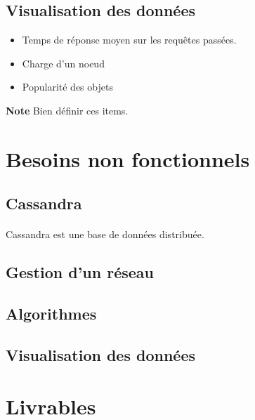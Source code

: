 \documentclass[12pt]{article}
\begin{document}
\subsection{Visualisation des données}

\begin{itemize}
 \item Temps de réponse moyen sur les requêtes passées.
 \item Charge d'un noeud
 \item Popularité des objets
\end{itemize}


\textbf{Note } Bien définir ces items. \newline


\newpage

\section{Besoins non fonctionnels}

\subsection{Cassandra}

\paragraph{} Cassandra est une base de données distribuée. 


\subsection{Gestion d'un réseau}

\subsection{Algorithmes}

\subsection{Visualisation des données}


\newpage

\section{Livrables}


\end{document}
